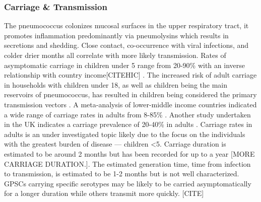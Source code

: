 \documentclass{article}
\begin{document}
\subsubsection{Carriage \& Transmission} 
The pneumococcus colonizes mucosal surfaces in the upper respiratory tract, it promotes inflammation predominantly via pneumolysins which results in secretions and shedding. Close contact, co-occurrence with viral infections, and colder drier months all correlate with more likely transmission\cite{weiserStreptococcusPneumoniaeTransmission2018}. Rates of asymptomatic carriage in children under 5 range from 20-90\% with an inverse relationship with country income[CITEHIC] \cite{adegbolaCarriageStreptococcusPneumoniae2014}. The increased risk of adult carriage in households with children under 18, as well as children being the main reservoirs of pneumococcus, has resulted in children being considered the primary transmission vectors \cite{almeidaDynamicsPneumococcalCarriage2020,bogaertStreptococcusPneumoniaeColonisation2004}. A meta-analysis of lower-middle income countries indicated a wide range of carriage rates in adults from 8-85\% \cite{adegbolaCarriageStreptococcusPneumoniae2014}. Another study undertaken in the UK indicates a carriage prevalence of 20-40\% in adults\cite{almeidaDynamicsPneumococcalCarriage2020} . Carriage rates in adults is an under investigated topic likely due to the focus on the individuals with the greatest burden of disease --- children <5.  Carriage duration is estimated to be around 2 months but has been recorded for up to a year \cite{almeidaDynamicsPneumococcalCarriage2020,dubeLongitudinalCharacterizationNasopharyngeal2018} [MORE CARRIAGE DURATION.]. The estimated generation time, time from infection to transmission, is estimated to be 1-2 months but is not well characterized. GPSCs carrying specific serotypes may be likely to be carried asymptomatically for a longer duration while others transmit more quickly. [CITE] 
\end{document}

